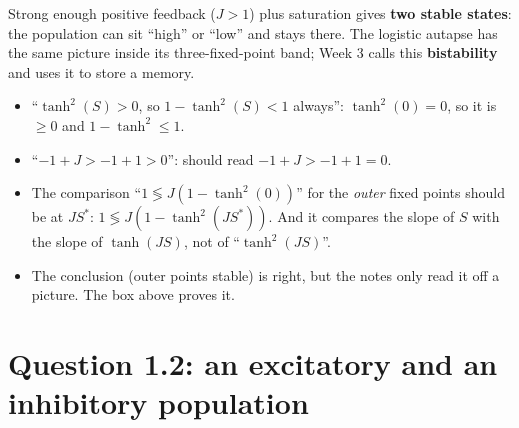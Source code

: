 \begin{intuition}
Strong enough positive feedback ($J>1$) plus saturation gives \textbf{two stable states}: the population can sit ``high'' or ``low'' and stays there. The logistic autapse has the same picture inside its three-fixed-point band; Week 3 calls this \textbf{bistability} and uses it to store a memory.
\end{intuition}

\begin{pitfall}
\begin{itemize}
  \item ``$\tanh^2(S)>0$, so $1-\tanh^2(S)<1$ always'': $\tanh^2(0)=0$, so it is $\ge0$ and $1-\tanh^2\le1$.
  \item ``$-1+J>-1+1>0$'': should read $-1+J>-1+1=0$.
  \item The comparison ``$1\lessgtr J(1-\tanh^2(0))$'' for the \emph{outer} fixed points should be at $JS^*$: $1\lessgtr J(1-\tanh^2(JS^*))$. And it compares the slope of $S$ with the slope of $\tanh(JS)$, not of ``$\tanh^2(JS)$''.
  \item The conclusion (outer points stable) is right, but the notes only read it off a picture. The box above proves it.
\end{itemize}
\end{pitfall}

\section{Question 1.2: an excitatory and an inhibitory population}

\begin{center}
\end{center}


